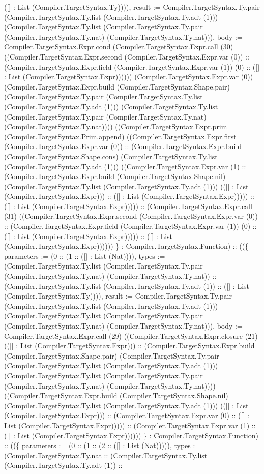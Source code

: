 \documentclass[11pt]{article}
\begin{document}
([] : List (Compiler.TargetSyntax.Ty)))), result := Compiler.TargetSyntax.Ty.pair (Compiler.TargetSyntax.Ty.list (Compiler.TargetSyntax.Ty.adt (1))) (Compiler.TargetSyntax.Ty.list (Compiler.TargetSyntax.Ty.pair (Compiler.TargetSyntax.Ty.nat) (Compiler.TargetSyntax.Ty.nat))), body := Compiler.TargetSyntax.Expr.cond (Compiler.TargetSyntax.Expr.call (30) ((Compiler.TargetSyntax.Expr.second (Compiler.TargetSyntax.Expr.var (0)) :: (Compiler.TargetSyntax.Expr.field (Compiler.TargetSyntax.Expr.var (1)) (0) :: ([] : List (Compiler.TargetSyntax.Expr)))))) (Compiler.TargetSyntax.Expr.var (0)) (Compiler.TargetSyntax.Expr.build (Compiler.TargetSyntax.Shape.pair) (Compiler.TargetSyntax.Ty.pair (Compiler.TargetSyntax.Ty.list (Compiler.TargetSyntax.Ty.adt (1))) (Compiler.TargetSyntax.Ty.list (Compiler.TargetSyntax.Ty.pair (Compiler.TargetSyntax.Ty.nat) (Compiler.TargetSyntax.Ty.nat)))) ((Compiler.TargetSyntax.Expr.prim (Compiler.TargetSyntax.Prim.append) ((Compiler.TargetSyntax.Expr.first (Compiler.TargetSyntax.Expr.var (0)) :: (Compiler.TargetSyntax.Expr.build (Compiler.TargetSyntax.Shape.cons) (Compiler.TargetSyntax.Ty.list (Compiler.TargetSyntax.Ty.adt (1))) ((Compiler.TargetSyntax.Expr.var (1) :: (Compiler.TargetSyntax.Expr.build (Compiler.TargetSyntax.Shape.nil) (Compiler.TargetSyntax.Ty.list (Compiler.TargetSyntax.Ty.adt (1))) (([] : List (Compiler.TargetSyntax.Expr))) :: ([] : List (Compiler.TargetSyntax.Expr))))) :: ([] : List (Compiler.TargetSyntax.Expr))))) :: (Compiler.TargetSyntax.Expr.call (31) ((Compiler.TargetSyntax.Expr.second (Compiler.TargetSyntax.Expr.var (0)) :: (Compiler.TargetSyntax.Expr.field (Compiler.TargetSyntax.Expr.var (1)) (0) :: ([] : List (Compiler.TargetSyntax.Expr))))) :: ([] : List (Compiler.TargetSyntax.Expr)))))) \} : Compiler.TargetSyntax.Function) :: ((\{ parameters := (0 :: (1 :: ([] : List (Nat)))), types := (Compiler.TargetSyntax.Ty.list (Compiler.TargetSyntax.Ty.pair (Compiler.TargetSyntax.Ty.nat) (Compiler.TargetSyntax.Ty.nat)) :: (Compiler.TargetSyntax.Ty.list (Compiler.TargetSyntax.Ty.adt (1)) :: ([] : List (Compiler.TargetSyntax.Ty)))), result := Compiler.TargetSyntax.Ty.pair (Compiler.TargetSyntax.Ty.list (Compiler.TargetSyntax.Ty.adt (1))) (Compiler.TargetSyntax.Ty.list (Compiler.TargetSyntax.Ty.pair (Compiler.TargetSyntax.Ty.nat) (Compiler.TargetSyntax.Ty.nat))), body := Compiler.TargetSyntax.Expr.call (29) ((Compiler.TargetSyntax.Expr.closure (21) (([] : List (Compiler.TargetSyntax.Expr))) :: (Compiler.TargetSyntax.Expr.build (Compiler.TargetSyntax.Shape.pair) (Compiler.TargetSyntax.Ty.pair (Compiler.TargetSyntax.Ty.list (Compiler.TargetSyntax.Ty.adt (1))) (Compiler.TargetSyntax.Ty.list (Compiler.TargetSyntax.Ty.pair (Compiler.TargetSyntax.Ty.nat) (Compiler.TargetSyntax.Ty.nat)))) ((Compiler.TargetSyntax.Expr.build (Compiler.TargetSyntax.Shape.nil) (Compiler.TargetSyntax.Ty.list (Compiler.TargetSyntax.Ty.adt (1))) (([] : List (Compiler.TargetSyntax.Expr))) :: (Compiler.TargetSyntax.Expr.var (0) :: ([] : List (Compiler.TargetSyntax.Expr))))) :: (Compiler.TargetSyntax.Expr.var (1) :: ([] : List (Compiler.TargetSyntax.Expr)))))) \} : Compiler.TargetSyntax.Function) :: ((\{ parameters := (0 :: (1 :: (2 :: ([] : List (Nat))))), types := (Compiler.TargetSyntax.Ty.nat :: (Compiler.TargetSyntax.Ty.list (Compiler.TargetSyntax.Ty.adt (1)) :: 
\end{document}
